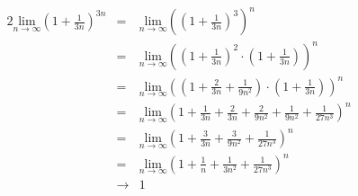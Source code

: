 \documentclass[10pt,a4paper,oneside,ngerman,numbers=noenddot]{scrartcl}
\begin{document}
\subsubsection{} %
\begin{alignat*}{2}
\underset{n \rightarrow \infty}{\text{lim}} \left(1 + \frac{1}{3n} \right)^{3n} &=& \underset{n \rightarrow \infty}{\text{lim}} \left( \left(1 + \frac{1}{3n} \right)^{3} \right)^{n} \\
&=&  \underset{n \rightarrow \infty}{\text{lim}} \left( \left(1 + \frac{1}{3n} \right)^{2} \cdot \left(1 + \frac{1}{3n} \right) \right)^{n} \\
&=& \underset{n \rightarrow \infty}{\text{lim}} \left( \left(1 + \frac{2}{3n} + \frac{1}{9n^{2}} \right) \cdot \left(1 + \frac{1}{3n} \right) \right)^{n} \\
&=& \underset{n \rightarrow \infty}{\text{lim}} \left( 1 + \frac{1}{3n} + \frac{2}{3n} + \frac{2}{9n^{2}} + \frac{1}{9n^{2}} + \frac{1}{27n^{3}} \right)^{n} \\
&=& \underset{n \rightarrow \infty}{\text{lim}} \left( 1 + \frac{3}{3n} + \frac{3}{9n^{2}} + \frac{1}{27n^{3}} \right)^{n} \\
&=& \underset{n \rightarrow \infty}{\text{lim}} \left( 1 + \frac{1}{n} + \frac{1}{3n^{2}} + \frac{1}{27n^{3}} \right)^{n} \\
&\rightarrow & 1
\end{alignat*}
\end{document}
